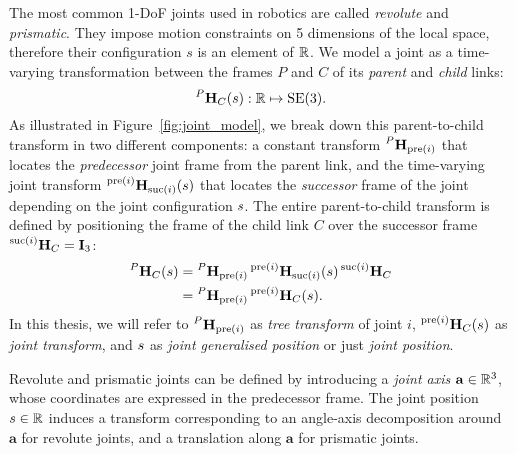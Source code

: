 The most common 1-\ac{DoF} joints used in robotics are called \emph{revolute} and \emph{prismatic}.
They impose motion constraints on 5 dimensions of the local space, therefore their configuration $s$ is an element of $\realn$.
We model a joint as a time-varying transformation between the frames $P$ and $C$ of its \emph{parent} and \emph{child} links:
%
\begin{equation*}
    \homo[P]_C(\shape) : \realn \mapsto \SE(3)
    .
\end{equation*}
%
As illustrated in Figure~\ref{fig:joint_model}, we break down this parent-to-child transform in two different components: a constant transform $\homo[P]_{\operatorname{pre}(i)}$ that locates the \emph{predecessor} joint frame from the parent link, and the time-varying joint transform $\homo[\operatorname{pre}(i)]_{\operatorname{suc}(i)}(\shape)$ that locates the \emph{successor} frame of the joint depending on the joint configuration $\emph{s}$.
The entire parent-to-child transform is defined by positioning the frame of the child link $C$ over the successor frame $\homo[\operatorname{suc}(i)]_C = \eye_3$:
%
\begin{align}
    \label{equation:joint_model_parent_to_child_transform}
    \homo[P]_C(\shape) &= \homo[P]_{\operatorname{pre}(i)} \homo[\operatorname{pre}(i)]_{\operatorname{suc}(i)}(\shape) \homo[\operatorname{suc}(i)]_C \nonumber \\
    &= \homo[P]_{\operatorname{pre}(i)} \homo[\operatorname{pre}(i)]_C(\shape)
    .
\end{align}
%
In this thesis, we will refer to $\homo[P]_{\operatorname{pre}(i)}$ as \emph{tree transform} of joint $i$, $\homo[\operatorname{pre}(i)]_C(\shape)$ as \emph{joint transform}, and $\shape$ as \emph{joint generalised position} or just \emph{joint position}.

\begin{definition*}
    Revolute and prismatic joints can be defined by introducing a \emph{joint axis} $\mathbf{a} \in \realn^3$, whose coordinates are expressed in the predecessor frame.
    The joint position $\shape \in \realn$ induces a transform corresponding to an angle-axis decomposition around $\mathbf{a}$ for revolute joints, and a translation along $\mathbf{a}$ for prismatic joints.
\end{definition*}

